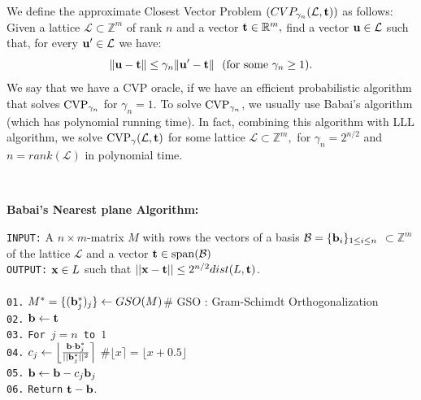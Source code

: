 \documentclass{amsart}
\numberwithin{equation}{section}
\begin{document}
We define the approximate Closest Vector Problem $(CVP_{\gamma_{n}}({\mathcal{L}},{\bf t}))$  as follows:
Given a lattice $\mathcal{L}\subset {\mathbb{Z}}^m$ of rank $n$ and a vector 
${\bf t}\in {\mathbb{R}}^m,$ 
find a vector ${\bf u}\in \mathcal{L}$ such that, for every ${\bf u}'\in \mathcal{L}$
 we have:
\[\|{\bf u}-{\bf t}\|\leq \gamma_n \|{\bf u}'-{\bf t}\|\ \
 (\text{for some}\ \gamma_n\geq 1).\]
We say that we have a CVP oracle, if we have an efficient probabilistic algorithm 
that solves ${\rm CVP}_{\gamma_n}$ for $\gamma_n=1.$ To solve 
${\rm{CVP}}_{\gamma_n}$, we
  usually use Babai's algorithm \cite[Chapter 18]{gal} (which has polynomial running
   time). In fact, combining this algorithm with LLL algorithm, we solve 
${\rm{CVP}}_{\gamma}(\mathcal{L},{\bf t})$ for some lattice
 $\mathcal{L}\subset {\mathbb{Z}}^m,$ for $\gamma_n = 2^{n/2}$ 
 and $n=rank(\mathcal{L})$ in polynomial time.
 
 \
 
\begin{center}
\textbf{Babai's Nearest plane Algorithm:}
\end{center}
{\texttt{INPUT:}}  A $n\times m$-matrix $M$ with rows the vectors of a basis $\mathcal{B}=\{{\bf b}_i\}_{1\leq i\leq n}$ $\subset\mathbb{Z}^{m}$ 
of the lattice $\mathcal{L}$ and a vector ${\bf t}\in {\rm{span}}({\mathcal{B}})$\\
{\texttt{OUTPUT:}} {${\bf x}\in L$ such that $||{\bf x}-{\bf t}||\leq 2^{n/2}dist(L,{\bf t})$.}\\\\
    \texttt{01.}   $M^{*}=\{({\bf b}_j^*)_j \}\leftarrow GSO(M)$\hspace{0.47cm}\# GSO 
    : Gram-Schimdt Orthogonalization\\
    \texttt{02.}   ${\bf b}\leftarrow {\bf t}$\\
	\texttt{03.}   {\texttt{For $j=n$ to $1$}}\\
	\texttt{04.}    \hspace{1cm} $c_{j}\leftarrow   \Big{\lfloor} \frac{{\bf b}\cdot 
	{\bf b}^*_j}{||{\bf b}^*_j||^2} \Big{\rceil}$\hspace*{1.1cm} $ \#  \lfloor x 
	\rceil = \lfloor x+0.5 \rfloor$ \\
    \texttt{05.} \hspace{1.2cm}${\bf{b}} \leftarrow {\bf{b}} - c_{j}{\bf b}_j$\\
    \texttt{06.}  {\texttt{Return}} ${\bf t}-{\bf b}$.\ \\
\end{document}
